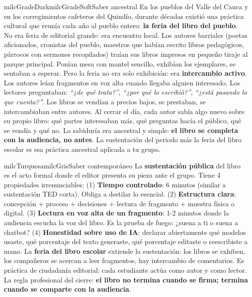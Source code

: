 \documentclass[11pt,letterpaper]{article}
\begin{document}
\begin{softbox}{milcGradeDark}{milcGradeSoft}{Saber ancestral}
En los pueblos del Valle del Cauca y en los corregimientos cafeteros del Quindío, durante décadas existió una práctica cultural que reunía cada año al pueblo entero: \textbf{la feria del libro del pueblo}. No era feria de editorial grande: era encuentro local. Los autores barriales (poetas aficionados, cronistas del pueblo, maestros que habían escrito libros pedagógicos, párrocos con sermones recopilados) traían sus libros impresos en pequeño tiraje al parque principal. Ponían mesa con mantel sencillo, exhibían los ejemplares, se sentaban a esperar. Pero la feria no era solo exhibición: era \textbf{intercambio activo}. Los autores leían fragmentos en voz alta cuando llegaba alguien interesado. Los lectores preguntaban: \emph{``¿de qué trata?''}, \emph{``¿por qué lo escribió?''}, \emph{``¿está pasando lo que cuenta?''}. Los libros se vendían a precios bajos, se prestaban, se intercambiaban entre autores. Al cerrar el día, cada autor sabía algo nuevo sobre su propio libro: qué partes interesaban más, qué preguntas hacía el público, qué se vendía y qué no. La sabiduría era ancestral y simple: \textbf{el libro se completa con la audiencia, no antes}. La sustentación del periodo más la feria del libro escolar es esa práctica ancestral aplicada a tu grupo.
\end{softbox}

\begin{softbox}{milcTurquesa}{milcGris}{Saber contemporáneo}
La \textbf{sustentación pública} del libro es el acto formal donde el editor presenta su pieza ante el grupo. Tiene 4 propiedades irrenunciables: (1) \textbf{Tiempo controlado}: 6 minutos (similar a sustentación TED corta). Obliga a destilar lo esencial. (2) \textbf{Estructura clara}: concepción + proceso + decisiones + lectura de fragmento + muestra física o digital. (3) \textbf{Lectura en voz alta de un fragmento}: 1-2 minutos donde la audiencia escucha la voz del libro. Es la prueba de fuego: ¿suena a ti o suena a chatbot? (4) \textbf{Honestidad sobre uso de IA}: declarar abiertamente qué modelos usaste, qué porcentaje del texto generaste, qué porcentaje editaste o reescribiste a mano. La \textbf{feria del libro escolar} extiende la sustentación: los libros se exhiben, los compañeros se acercan a leer fragmentos, hay intercambio de comentarios. Es práctica de ciudadanía editorial: cada estudiante actúa como autor y como lector. La regla profesional del cierre: \textbf{el libro no termina cuando se firma; termina cuando se comparte con la audiencia}.
\end{softbox}
\end{document}
